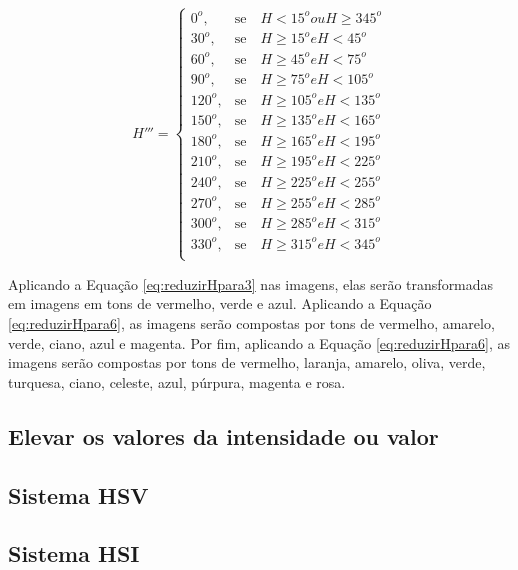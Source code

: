 \documentclass[	12pt, Times, openright, twoside, a4paper, english, brazil]{abntex2}
\begin{document}
\begin{equation}
\label{eq:reduzirHpara12}
H'''=\left\{
\begin{array}{rc}
    0^o,&\mbox{se}\quad H <15^o ou H \geq 345^o \\
    30^o,&\mbox{se}\quad H \geq 15^o e H < 45^o \\
    60^o,&\mbox{se}\quad H \geq 45^o e H < 75^o \\
    90^o,&\mbox{se}\quad H \geq 75^o e H < 105^o \\
    120^o,&\mbox{se}\quad H \geq 105^o e H < 135^o \\
    150^o,&\mbox{se}\quad H \geq 135^o e H < 165^o \\
    180^o,&\mbox{se}\quad H \geq 165^o e H < 195^o \\
    210^o,&\mbox{se}\quad H \geq 195^o e H < 225^o \\
    240^o,&\mbox{se}\quad H \geq 225^o e H < 255^o \\
    270^o,&\mbox{se}\quad H \geq 255^o e H < 285^o \\
    300^o,&\mbox{se}\quad H \geq 285^o e H < 315^o \\
    330^o,&\mbox{se}\quad H \geq 315^o e H < 345^o \\
\end{array}\right.
\end{equation}

Aplicando a Equação \ref{eq:reduzirHpara3} nas imagens, elas serão transformadas em imagens em tons de vermelho, verde e azul. Aplicando a Equação \ref{eq:reduzirHpara6}, as imagens serão compostas por tons de vermelho, amarelo, verde, ciano, azul e magenta. Por fim, aplicando a Equação \ref{eq:reduzirHpara6}, as imagens serão compostas por tons de vermelho, laranja, amarelo, oliva, verde, turquesa, ciano, celeste, azul, púrpura, magenta e rosa.



\subsection{Elevar os valores da intensidade ou valor}
\label{subsec:deslocarVouI}



\subsection{Sistema HSV}
\label{subsec:alterarValues} 

\subsection{Sistema HSI}
\end{document}
